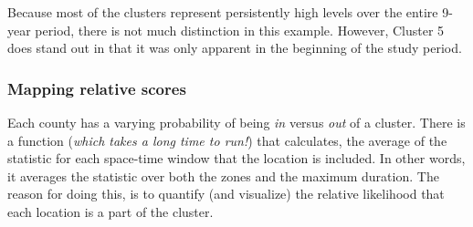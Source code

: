 \documentclass[
]{book}
\newenvironment{Shaded}{\begin{snugshade}}{\end{snugshade}}
\newcommand{\AttributeTok}[1]{\textcolor[rgb]{0.77,0.63,0.00}{#1}}
\newcommand{\CommentTok}[1]{\textcolor[rgb]{0.56,0.35,0.01}{\textit{#1}}}
\newcommand{\DecValTok}[1]{\textcolor[rgb]{0.00,0.00,0.81}{#1}}
\newcommand{\DocumentationTok}[1]{\textcolor[rgb]{0.56,0.35,0.01}{\textbf{\textit{#1}}}}
\newcommand{\FunctionTok}[1]{\textcolor[rgb]{0.00,0.00,0.00}{#1}}
\newcommand{\NormalTok}[1]{#1}
\newcommand{\OtherTok}[1]{\textcolor[rgb]{0.56,0.35,0.01}{#1}}
\newcommand{\SpecialCharTok}[1]{\textcolor[rgb]{0.00,0.00,0.00}{#1}}
\newcommand{\StringTok}[1]{\textcolor[rgb]{0.31,0.60,0.02}{#1}}
\begin{document}
\begin{Shaded}
\end{Shaded}

Because most of the clusters represent persistently high levels over the entire 9-year period, there is not much distinction in this example. However, Cluster 5 does stand out in that it was only apparent in the beginning of the study period.

\hypertarget{mapping-relative-scores}{%
\subsubsection{Mapping relative scores}\label{mapping-relative-scores}}

Each county has a varying probability of being \emph{in} versus \emph{out} of a cluster. There is a function (\emph{which takes a long time to run!}) that calculates, the average of the statistic for each space-time window that the location is included. In other words, it averages the statistic over both the zones and the maximum duration. The reason for doing this, is to quantify (and visualize) the relative likelihood that each location is a part of the cluster.
\end{document}
